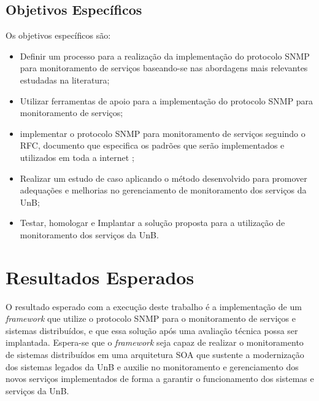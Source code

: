 \subsection{Objetivos Específicos}

Os objetivos específicos são:

\begin{itemize}
	 
\item Definir um processo para a realização da implementação do protocolo SNMP para monitoramento de serviços baseando-se nas  abordagens mais relevantes estudadas na literatura;

\item Utilizar ferramentas de apoio para a implementação do protocolo SNMP para monitoramento de serviços;

\item implementar o protocolo SNMP para monitoramento de serviços seguindo o RFC\cite{Schoffstall}, documento que especifica os padrões que serão implementados e utilizados em toda a internet ;

\item Realizar um estudo de caso aplicando o método desenvolvido para promover adequações e melhorias no gerenciamento de monitoramento dos serviços da UnB; 

\item Testar, homologar e Implantar a solução proposta para a utilização de monitoramento dos serviços da UnB. 

\end{itemize}


\section{Resultados Esperados}

O resultado esperado com a execução deste trabalho é a implementação de um \textit{framework} que utilize o protocolo SNMP para o monitoramento de serviços e sistemas distribuídos, e que essa solução após uma avaliação técnica possa ser implantada. Espera-se que o \textit{framework} seja capaz de realizar o monitoramento de sistemas distribuídos em uma arquitetura SOA que sustente a modernização dos sistemas legados da UnB e auxilie no monitoramento e gerenciamento dos novos serviços implementados de forma a garantir o funcionamento dos sistemas e serviços da UnB.


